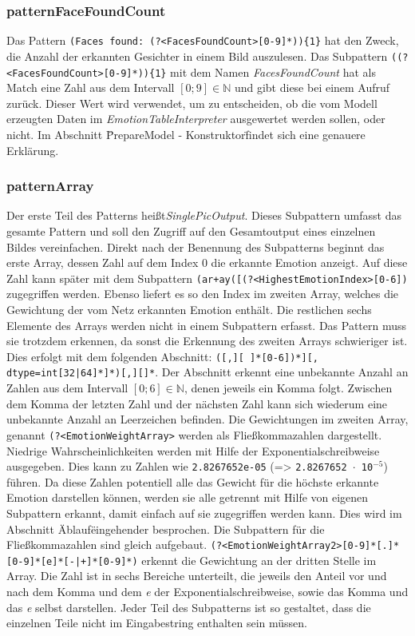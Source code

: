 \documentclass[12pt,a4paper,headinclude,twoside, plainheadsepline, open=right,numbers=noenddot]{scrreprt}
\begin{document}
\subsubsection{patternFaceFoundCount}
Das Pattern \texttt{(Faces found:  (?<FacesFoundCount>[0-9]*))\{1\}} hat den Zweck, die Anzahl der erkannten Gesichter in einem Bild auszulesen. Das Subpattern \texttt{((?<FacesFoundCount>[0-9]*))\{1\}} mit dem Namen \textit{FacesFoundCount} hat als Match eine Zahl aus dem Intervall $\left[0;9\right] \in \mathbb{N}$ und gibt diese bei einem Aufruf zur\"{u}ck. Dieser Wert wird verwendet, um zu entscheiden, ob die vom Modell erzeugten Daten im \textit{EmotionTableInterpreter} ausgewertet werden sollen, oder nicht. Im Abschnitt \"PrepareModel - Konstruktor\" findet sich eine genauere Erkl\"{a}rung.
\subsubsection{patternArray}
Der erste Teil des Patterns hei{\ss}t\textit{SinglePicOutput}. Dieses Subpattern umfasst das gesamte Pattern und soll den 
Zugriff auf den Gesamtoutput eines einzelnen Bildes vereinfachen. Direkt nach der Benennung des Subpatterns beginnt 
das erste Array, dessen Zahl auf dem Index 0 die erkannte Emotion anzeigt. Auf diese Zahl kann sp\"{a}ter mit dem Subpattern 
\texttt{(ar+ay([(?<HighestEmotionIndex>[0-6])} zugegriffen werden.  Ebenso liefert es so den Index im zweiten Array, 
welches die Gewichtung der vom Netz erkannten Emotion enth\"{a}lt. Die restlichen sechs Elemente des Arrays werden nicht in 
einem Subpattern erfasst. Das Pattern muss sie trotzdem erkennen, da  sonst die Erkennung des zweiten Arrays 
schwieriger ist. Dies erfolgt mit dem folgenden Abschnitt: \texttt{([,][ ]*[0-6])*][, dtype=int[32|64]*]*)[,][]*}. Der Abschnitt 
erkennt eine unbekannte Anzahl an Zahlen aus dem Intervall $\left[0;6\right] \in \mathbb{N}$, denen jeweils ein Komma 
folgt. Zwischen dem Komma der letzten Zahl und der n\"{a}chsten Zahl kann sich wiederum eine unbekannte Anzahl an 
Leerzeichen befinden.
Die Gewichtungen im zweiten Array, genannt \texttt{(?<EmotionWeightArray>} werden als Flie{\ss}kommazahlen 
dargestellt. Niedrige Wahrscheinlichkeiten werden mit Hilfe der Exponentialschreibweise ausgegeben. Dies kann zu Zahlen 
wie \texttt{2.8267652e-05} (=> \texttt{2.8267652 $\cdot$ 10$^{-5}$}) f\"{u}hren. Da diese Zahlen potentiell alle das Gewicht 
f\"{u}r die h\"{o}chste erkannte Emotion darstellen k\"{o}nnen, werden sie alle getrennt mit Hilfe von eigenen Subpattern erkannt, 
damit einfach auf sie zugegriffen werden kann. Dies wird im Abschnitt \"Ablauf\" eingehender besprochen. Die Subpattern 
f\"{u}r die Flie{\ss}kommazahlen sind gleich aufgebaut. \texttt{(?<EmotionWeightArray2>[0-9]*[.]*[0-9]*[e]*[-|+]*[0-9]*)} 
erkennt die Gewichtung an der dritten Stelle im Array. Die Zahl ist in sechs Bereiche unterteilt, die jeweils den Anteil vor und  
nach dem Komma und dem \textit{e} der Exponentialschreibweise, sowie das Komma und das  \textit{e} selbst darstellen. 
Jeder Teil des Subpatterns ist so gestaltet, dass die einzelnen Teile nicht im Eingabestring enthalten sein m\"{u}ssen.
\end{document}
